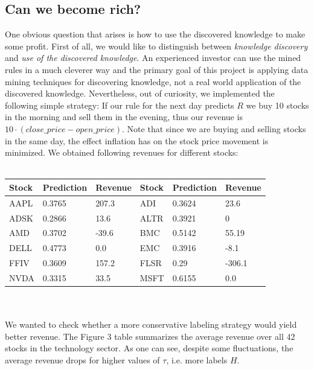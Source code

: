 \documentclass{llncs}
\begin{document}
\subsection*{Can we become rich?}
One obvious question that arises is how to use the discovered knowledge to make some profit. First of all, we would like to distinguish between {\em knowledge discovery} and {\em use of the discovered knowledge}. An experienced investor can use the mined rules in a much cleverer way and the primary goal of this project is applying data mining techniques for discovering knowledge, not a real world application of the discovered knowledge. Nevertheless, out of curiosity, we implemented the following simple strategy: If our rule for the next day predicts $R$ we buy 10 stocks in the morning and sell them in the evening, thus our revenue is $10\cdot (close\_price - open\_price)$. Note that since we are buying and selling stocks in the same day, the effect inflation has on the stock price movement is minimized.  We obtained following revenues for different stocks:
\\\\
\begin{tabular}{| l | l | l || l | l | l |}
\hline
Stock & Prediction & Revenue & Stock & Prediction & Revenue\\
\hline
AAPL & 0.3765 & 207.3 & ADI & 0.3624 & 23.6\\
\hline
ADSK & 0.2866 & 13.6 &  ALTR & 0.3921 & 0\\
\hline
AMD & 0.3702 & -39.6 & BMC & 0.5142 & 55.19\\
\hline
DELL & 0.4773 & 0.0 & EMC & 0.3916 & -8.1\\
\hline
FFIV & 0.3609 & 157.2 & FLSR & 0.29 & -306.1\\
\hline
NVDA & 0.3315 & 33.5 & MSFT & 0.6155 & 0.0\\
\hline
\end{tabular}
\\\\We wanted to check whether a more conservative labeling strategy would yield better revenue. The Figure 3 table summarizes the average revenue over all 42 stocks in the technology sector. As one can see, despite some fluctuations, the average revenue drops for higher values of $\tau$, i.e. more labels $H$. 
\end{document}
